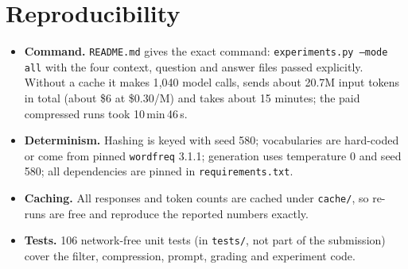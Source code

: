 \documentclass[11pt]{article}
\newcommand{\code}[1]{\texttt{#1}}
\begin{document}
\section{Reproducibility}
\begin{itemize}
  \item \textbf{Command.} \code{README.md} gives the exact command: \code{experiments.py --mode all}
        with the four context, question and answer files passed explicitly. Without a cache it makes
        1{,}040 model calls, sends about 20.7M input tokens in total (about \$6 at \$0.30/M) and takes about 15 minutes; the paid compressed runs took 10\,min\,46\,s.
  \item \textbf{Determinism.} Hashing is keyed with seed 580; vocabularies are hard-coded or come from
        pinned \code{wordfreq} 3.1.1; generation uses temperature 0 and seed 580; all dependencies are
        pinned in \code{requirements.txt}.
  \item \textbf{Caching.} All responses and token counts are cached under \code{cache/}, so re-runs
        are free and reproduce the reported numbers exactly.
  \item \textbf{Tests.} 106 network-free unit tests (in \code{tests/}, not part of the submission)
        cover the filter, compression, prompt, grading and experiment code.
\end{itemize}
\end{document}
